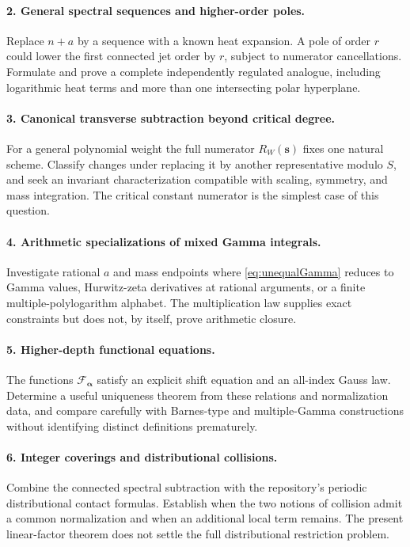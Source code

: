 \documentclass[11pt]{article}
\numberwithin{equation}{section}
\theoremstyle{definition}\newtheorem{definition}[theorem]{Definition}
\theoremstyle{remark}\newtheorem{remark}[theorem]{Remark}
\newcommand{\bs}{\boldsymbol{s}}
\newcommand{\ba}{\boldsymbol{\alpha}}
\newcommand{\cF}{\mathcal F}
\begin{document}
\paragraph{2. General spectral sequences and higher-order poles.}
Replace $n+a$ by a sequence with a known heat expansion. A pole of order $r$ could lower the first connected jet order by $r$, subject to numerator cancellations. Formulate and prove a complete independently regulated analogue, including logarithmic heat terms and more than one intersecting polar hyperplane.

\paragraph{3. Canonical transverse subtraction beyond critical degree.}
For a general polynomial weight the full numerator $R_W(\bs)$ fixes one natural scheme. Classify changes under replacing it by another representative modulo $S$, and seek an invariant characterization compatible with scaling, symmetry, and mass integration. The critical constant numerator is the simplest case of this question.

\paragraph{4. Arithmetic specializations of mixed Gamma integrals.}
Investigate rational $a$ and mass endpoints where \eqref{eq:unequalGamma} reduces to Gamma values, Hurwitz-zeta derivatives at rational arguments, or a finite multiple-polylogarithm alphabet. The multiplication law supplies exact constraints but does not, by itself, prove arithmetic closure.

\paragraph{5. Higher-depth functional equations.}
The functions $\cF_{\ba}$ satisfy an explicit shift equation and an all-index Gauss law. Determine a useful uniqueness theorem from these relations and normalization data, and compare carefully with Barnes-type and multiple-Gamma constructions without identifying distinct definitions prematurely.

\paragraph{6. Integer coverings and distributional collisions.}
Combine the connected spectral subtraction with the repository's periodic distributional contact formulas. Establish when the two notions of collision admit a common normalization and when an additional local term remains. The present linear-factor theorem does not settle the full distributional restriction problem.
\end{document}
